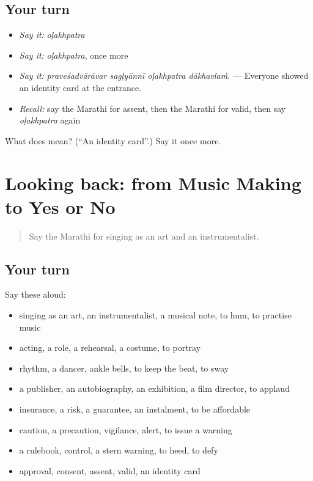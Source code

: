 \subsection*{Your turn}
\begin{itemize}
\raggedright
  \item \emph{Say it:} \emph{oḷakhpatra}
  \item \emph{Say it:} \emph{oḷakhpatra}, once more
  \item \emph{Say it:} \emph{praveśadvārāvar sagḷyānnī oḷakhpatra dākhavlaṁ.} — Everyone showed an identity card at the entrance.
  \item \emph{Recall:} say the Marathi for assent, then the Marathi for valid, then say \emph{oḷakhpatra} again
\end{itemize}

\begin{tcolorbox}[breakable,colback=teal!4,colframe=teal!35!black,title={Before you move on}]
What does  mean? (\textquotedblleft{}An identity card\textquotedblright{}.) Say it once more.
\end{tcolorbox}
\section[(dialogue)]{Looking back: from Music Making to Yes or No}

\label{lesson:MR-R543-review-536-543}



\begin{quote}
Say the Marathi for singing as an art and an instrumentalist.
\end{quote}

\subsection*{Your turn}
Say these aloud:

\begin{itemize}
\raggedright
  \item singing as an art, an instrumentalist, a musical note, to hum, to practise music
  \item acting, a role, a rehearsal, a costume, to portray
  \item rhythm, a dancer, ankle bells, to keep the beat, to sway
  \item a publisher, an autobiography, an exhibition, a film director, to applaud
  \item insurance, a risk, a guarantee, an instalment, to be affordable
  \item caution, a precaution, vigilance, alert, to issue a warning
  \item a rulebook, control, a stern warning, to heed, to defy
  \item approval, consent, assent, valid, an identity card
\end{itemize}

